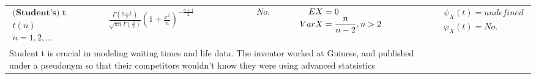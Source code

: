 \documentclass{article}
\begin{document}
\begin{landscape}
\begin{table}[ht]
\begin{tabular}{@{}l p{6.0cm} p{5cm} p{3.0cm} r@{}}
$\begin{array}{l}
    \textbf{(Student's) t} \\
    t(n) \\
    n = 1, 2,...
\end{array}$ & 

$\begin{array}{l}
\displaystyle \frac{\Gamma\left(\frac{n+1}{2}\right)}{\sqrt{\pi n} \Gamma\left(\frac{n}{2}\right)} \left(1+\frac{x^2}{n}\right)^{-\frac{n+1}{2}} \\
\end{array}$ & 
$\begin{array}{l}
    \displaystyle No. \\
\end{array}$ & 
$\begin{array}{l}
\displaystyle \hspace{0.36cm} EX = 0 \\
\displaystyle VarX = \frac{n}{n-2}, n>2\\
\end{array}$ & 
$\begin{array}{r}
\displaystyle \psi_X(t) = undefined \\
\displaystyle \varphi_X(t) = No.
\end{array}$ \\
\multicolumn{4}{p{19cm}}{Student t is crucial in modeling waiting times and life data. The inventor worked at Guiness, and published under a pseudonym so that their competitors wouldn't know they were using advanced statsistics} \\


\bottomrule
\end{tabular}
\end{table}
\end{landscape}
\end{document}
